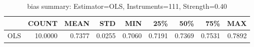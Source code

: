 \begin{table}[ht]
\centering
\caption{bias summary: Estimator=OLS, Instruments=111, Strength=0.40}
\begin{tabular}{lrrrrrrrr}
\toprule
 & COUNT & MEAN & STD & MIN & 25\% & 50\% & 75\% & MAX \\
\midrule
OLS & 10.0000 & 0.7377 & 0.0255 & 0.7060 & 0.7191 & 0.7369 & 0.7531 & 0.7892 \\
\bottomrule
\end{tabular}
\end{table}
